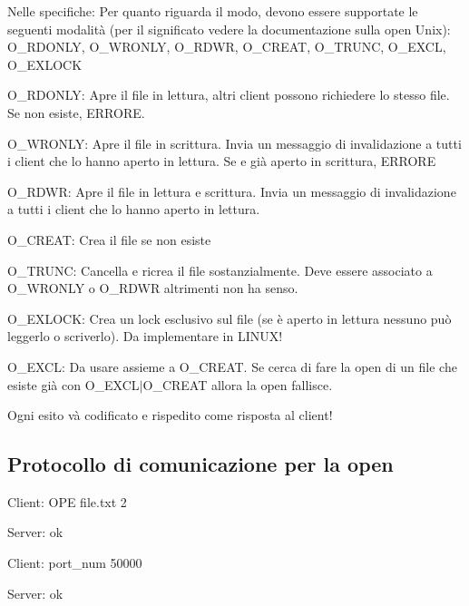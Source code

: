 Nelle specifiche\+: Per quanto riguarda il modo, devono essere supportate le seguenti modalità (per il significato vedere la documentazione sulla open Unix)\+: O\+\_\+\+R\+D\+O\+N\+L\+Y, O\+\_\+\+W\+R\+O\+N\+L\+Y, O\+\_\+\+R\+D\+W\+R, O\+\_\+\+C\+R\+E\+A\+T, O\+\_\+\+T\+R\+U\+N\+C, O\+\_\+\+E\+X\+C\+L, O\+\_\+\+E\+X\+L\+O\+C\+K


\begin{DoxyItemize}
\item O\+\_\+\+R\+D\+O\+N\+L\+Y\+: Apre il file in lettura, altri client possono richiedere lo stesso file. Se non esiste, E\+R\+R\+O\+R\+E.
\item O\+\_\+\+W\+R\+O\+N\+L\+Y\+: Apre il file in scrittura. Invia un messaggio di invalidazione a tutti i client che lo hanno aperto in lettura. Se e\textquotesingle{} già aperto in scrittura, E\+R\+R\+O\+R\+E
\item O\+\_\+\+R\+D\+W\+R\+: Apre il file in lettura e scrittura. Invia un messaggio di invalidazione a tutti i client che lo hanno aperto in lettura.
\item O\+\_\+\+C\+R\+E\+A\+T\+: Crea il file se non esiste
\item O\+\_\+\+T\+R\+U\+N\+C\+: Cancella e ricrea il file sostanzialmente. Deve essere associato a O\+\_\+\+W\+R\+O\+N\+L\+Y o O\+\_\+\+R\+D\+W\+R altrimenti non ha senso.
\item O\+\_\+\+E\+X\+L\+O\+C\+K\+: Crea un lock esclusivo sul file (se è aperto in lettura nessuno può leggerlo o scriverlo). Da implementare in L\+I\+N\+U\+X!
\item O\+\_\+\+E\+X\+C\+L\+: Da usare assieme a O\+\_\+\+C\+R\+E\+A\+T. Se cerca di fare la open di un file che esiste già con O\+\_\+\+E\+X\+C\+L$\vert$\+O\+\_\+\+C\+R\+E\+A\+T allora la open fallisce.
\end{DoxyItemize}

Ogni esito và codificato e rispedito come risposta al client! 

 \subsection*{Protocollo di comunicazione per la open}


\begin{DoxyEnumerate}
\item Client\+: O\+P\+E file.\+txt 2
\item Server\+: ok
\item Client\+: port\+\_\+num 50000
\item Server\+: ok 
\end{DoxyEnumerate}